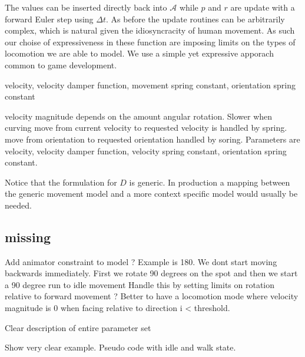The values can be inserted directly back into $\mathcal{A}$ while $p$ and $r$ are update with a forward Euler step using $\Delta{t}$. As before the update routines can be arbitrarily complex, which is natural given the idiosyncracity of human movement. As such our choise of expressiveness in these function are imposing limits on the types of locomotion we are able to model. We use a simple yet expressive apporach common to game development.   

velocity, velocity damper function, movement spring constant, orientation spring constant

velocity magnitude depends on the amount angular rotation. Slower when curving
move from current velocity to requested velocity is handled by spring.
move from orientation to requested orientation handled by soring.
Parameters are velocity, velocity damper function, velocity spring constant, orientation spring constant.


Notice that the formulation for $D$ is generic. In production a mapping between the generic movement model and a more context specific model would usually be needed. 

\subsection{missing}
Add animator constraint to model ? Example is 180. We dont start moving backwards immediately. First we rotate 90 degrees on the spot and then we start a 90 degree run to idle movement
Handle this by setting limits on rotation relative to forward movement ? Better to have a locomotion mode where velocity magnitude is 0 when facing relative to direction i < threshold.

Clear description of entire parameter set

Show very clear example. Pseudo code with idle and walk state. 